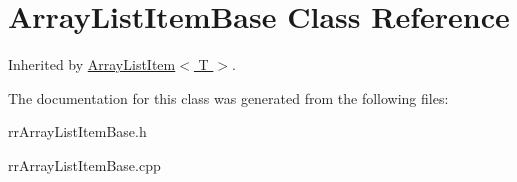 \hypertarget{classrrc_1_1_array_list_item_base}{\section{Array\+List\+Item\+Base Class Reference}
\label{classrrc_1_1_array_list_item_base}
}


Inherited by \hyperlink{classrrc_1_1_array_list_item}{Array\+List\+Item$<$ T $>$}.



The documentation for this class was generated from the following files\+:\begin{DoxyCompactItemize}
\item 
rr\+Array\+List\+Item\+Base.\+h\item 
rr\+Array\+List\+Item\+Base.\+cpp\end{DoxyCompactItemize}
